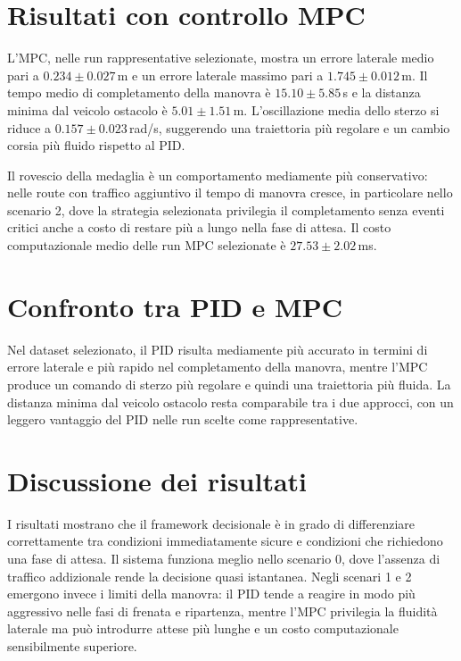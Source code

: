 \section{Risultati con controllo MPC}

L'MPC, nelle run rappresentative selezionate, mostra un errore laterale medio pari a $0.234 \pm 0.027$\,m e un errore laterale massimo pari a $1.745 \pm 0.012$\,m. Il tempo medio di completamento della manovra è $15.10 \pm 5.85$\,s e la distanza minima dal veicolo ostacolo è $5.01 \pm 1.51$\,m. L'oscillazione media dello sterzo si riduce a $0.157 \pm 0.023$\,rad/s, suggerendo una traiettoria più regolare e un cambio corsia più fluido rispetto al PID.

Il rovescio della medaglia è un comportamento mediamente più conservativo: nelle route con traffico aggiuntivo il tempo di manovra cresce, in particolare nello scenario 2, dove la strategia selezionata privilegia il completamento senza eventi critici anche a costo di restare più a lungo nella fase di attesa. Il costo computazionale medio delle run MPC selezionate è $27.53 \pm 2.02$\,ms.

\section{Confronto tra PID e MPC}





Nel dataset selezionato, il PID risulta mediamente più accurato in termini di errore laterale e più rapido nel completamento della manovra, mentre l'MPC produce un comando di sterzo più regolare e quindi una traiettoria più fluida. La distanza minima dal veicolo ostacolo resta comparabile tra i due approcci, con un leggero vantaggio del PID nelle run scelte come rappresentative.

\section{Discussione dei risultati}

I risultati mostrano che il framework decisionale è in grado di differenziare correttamente tra condizioni immediatamente sicure e condizioni che richiedono una fase di attesa. Il sistema funziona meglio nello scenario 0, dove l'assenza di traffico addizionale rende la decisione quasi istantanea. Negli scenari 1 e 2 emergono invece i limiti della manovra: il PID tende a reagire in modo più aggressivo nelle fasi di frenata e ripartenza, mentre l'MPC privilegia la fluidità laterale ma può introdurre attese più lunghe e un costo computazionale sensibilmente superiore.

